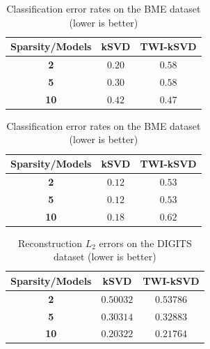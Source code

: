 \documentclass[10pt,twocolumn,letterpaper]{article}
\begin{document}
\begin{table}[!ht]
    \begin{minipage}{.55\linewidth}
      \centering
        \begin{tabular}{ccc}
            \toprule
            \textbf{Sparsity/Models} & \textbf{kSVD} & \textbf{TWI-kSVD} \\
            \midrule
            \textbf{2} & $\bm{0.20}$ & $0.58$ \\
            \textbf{5} & $0.30$ & $0.58$ \\
            \textbf{10} & $0.42$ & $0.47$ \\
            \bottomrule
        \end{tabular}
        \caption{Original classification strategy}
    \end{minipage}
    \begin{minipage}{.35\linewidth}
      \centering
        \begin{tabular}{ccc}
            \toprule
            \textbf{Sparsity/Models} & \textbf{kSVD} & \textbf{TWI-kSVD} \\
            \midrule
            \textbf{2} & $\bm{0.12}$ & $0.53$ \\
            \textbf{5} & $\bm{0.12}$ & $0.53$ \\
            \textbf{10} & $0.18$ & $0.62$ \\
            \bottomrule
        \end{tabular}
        \caption{Our classification strategy}
    \end{minipage} 
    \caption{Classification error rates on the BME dataset (lower is better)}
    \label{tab:classif_results_BME}
\end{table}

\begin{table}[ht]
    \centering
        \begin{tabular}{ccc}
            \toprule
            \textbf{Sparsity/Models} & \textbf{kSVD} & \textbf{TWI-kSVD} \\
            \midrule
            \textbf{2} & $0.50032$ & $0.53786$ \\
            \textbf{5} & $0.30314$ & $0.32883$ \\
            \textbf{10} & $\bm{0.20322}$ & $0.21764$ \\
            \bottomrule
        \end{tabular}
    \caption{Reconstruction $L_2$ errors on the DIGITS dataset (lower is better)}
    \label{tab:reconstruction_results_DIGITS}
\end{table}
\end{document}
